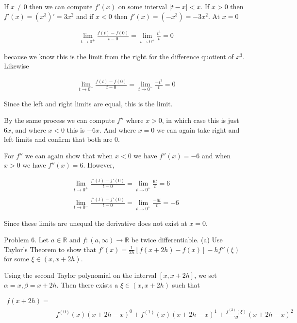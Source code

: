 \documentclass{article}
\begin{document}
  \vspace{1cm}

  If $x\ne 0$ then we can compute $f'(x)$ on some interval $|t-x|<x$.  If $x>0$ then $f'(x)=(x^3)'=3x^2$ and if $x<0$ then $f'(x)=(-x^3)=-3x^2$.  At $x=0$

  \begin{align*}
    \lim_{t\to 0^+}\frac{f(t)-f(0)}{t-0} = \lim_{t\to 0^+}\frac{t^3}{t} = 0
  \end{align*}

  because we know this is the limit from the right for the difference quotient of $x^3$.  Likewise

  \begin{align*}
    \lim_{t\to 0^-}\frac{f(t)-f(0)}{t-0} = \lim_{t\to 0^-}\frac{-t^3}{t}=0
  \end{align*}

  Since the left and right limits are equal, this is the limit.

  By the same process we can compute $f''$ where $x>0$, in which case this is just $6x$, and where $x<0$ this is $-6x$.  And where $x=0$ we can again take right and left limits and confirm that both are 0.

  For $f''$ we can again show that when $x<0$ we have $f''(x)=-6$ and when $x>0$ we have $f''(x)=6$.  However,

  \begin{align*}
    \lim_{t\to 0^+}\frac{f'(t)-f'(0)}{t-0}=\lim_{t\to 0^+}\frac{6t}{t} = 6\\\\
    \lim_{t\to 0^-}\frac{f'(t)-f'(0)}{t-0}=\lim_{t\to 0^+}\frac{-6t}{t}=-6\
  \end{align*}

  Since these limits are unequal the derivative does not exist at $x=0$.

  \pagebreak

  {\Large \color{Sepia} Problem 6. Let $a\in \mathbb R$ and $f:(a,\infty)\to \mathbb R$ be twice differentiable. (a) Use Taylor's Theorem to show that $f'(x)=\frac{1}{2h}[f(x+2h)-f(x)]-hf''(\xi)$ for some $\xi \in (x,x+2h)$.}

  \vspace{1cm}

  Using the second Taylor polynomial on the interval $[x,x+2h]$, we set $\alpha=x, \beta=x+2h$.  Then there exists a $\xi\in(x,x+2h)$ such that

  \begin{align*}
    f(x+2h) = \\
    &f^{(0)}(x)(x+2h-x)^0+f^{(1)}(x)(x+2h-x)^1+\frac{f^{(2)}(\xi)}{2!}(x+2h-x)^2
  \end{align*}
\end{document}
